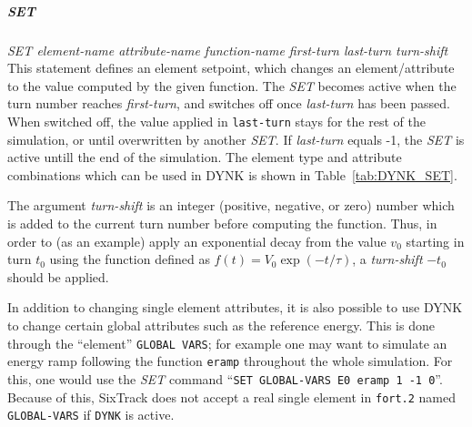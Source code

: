 

\subparagraph{SET} \emph{SET element-name attribute-name function-name first-turn last-turn turn-shift}\\
This statement defines an element setpoint, which changes an element/attribute to the value computed by the given function.
The \emph{SET} becomes active when the turn number reaches \emph{first-turn}, and switches off once \emph{last-turn} has been passed.
When switched off, the value applied in \texttt{last-turn} stays for the rest of the simulation, or until overwritten by another \emph{SET}.
If \emph{last-turn} equals -1, the \emph{SET} is active untill the end of the simulation.
The element type and attribute combinations which can be used in DYNK is shown in Table~\ref{tab:DYNK_SET}.

The argument \emph{turn-shift} is an integer (positive, negative, or zero) number which is added to the current turn number before computing the function.
Thus, in order to (as an example) apply an exponential decay from the value $v_0$ starting in turn $t_0$ using the function defined as $f(t) = V_0 \exp(-t/\tau)$,
a \emph{turn-shift} $-t_0$ should be applied.

In addition to changing single element attributes, it is also possible to use DYNK to change certain global attributes such as the reference energy.
This is done through the ``element'' \texttt{GLOBAL VARS}; for example one may want to simulate an energy ramp following the function \texttt{eramp} throughout the whole simulation.
For this, one would use the \emph{SET} command ``\texttt{SET GLOBAL-VARS E0 eramp 1 -1 0}''.
Because of this, SixTrack does not accept a real single element in \texttt{fort.2} named \texttt{GLOBAL-VARS} if \texttt{DYNK} is active.

